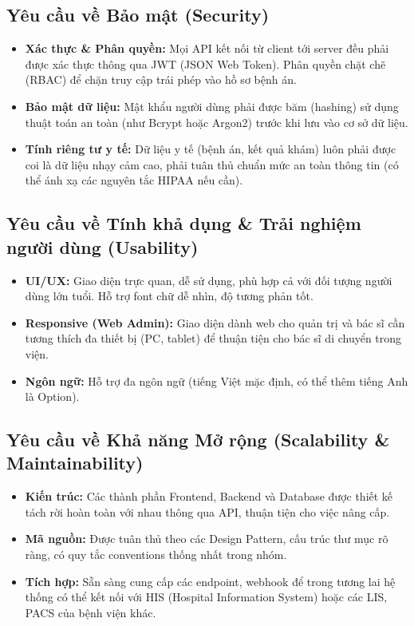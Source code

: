 \documentclass[12pt,a4paper]{article}
\begin{document}
\subsection{Yêu cầu về Bảo mật (Security)}
\begin{itemize}
    \item \textbf{Xác thực \& Phân quyền:} Mọi API kết nối từ client tới server đều phải được xác thực thông qua JWT (JSON Web Token). Phân quyền chặt chẽ (RBAC) để chặn truy cập trái phép vào hồ sơ bệnh án.
    \item \textbf{Bảo mật dữ liệu:} Mật khẩu người dùng phải được băm (hashing) sử dụng thuật toán an toàn (như Bcrypt hoặc Argon2) trước khi lưu vào cơ sở dữ liệu.
    \item \textbf{Tính riêng tư y tế:} Dữ liệu y tế (bệnh án, kết quả khám) luôn phải được coi là dữ liệu nhạy cảm cao, phải tuân thủ chuẩn mức an toàn thông tin (có thể ánh xạ các nguyên tắc HIPAA nếu cần).
\end{itemize}

\subsection{Yêu cầu về Tính khả dụng \& Trải nghiệm người dùng (Usability)}
\begin{itemize}
    \item \textbf{UI/UX:} Giao diện trực quan, dễ sử dụng, phù hợp cả với đối tượng người dùng lớn tuổi. Hỗ trợ font chữ dễ nhìn, độ tương phản tốt.
    \item \textbf{Responsive (Web Admin):} Giao diện dành web cho quản trị và bác sĩ cần tương thích đa thiết bị (PC, tablet) để thuận tiện cho bác sĩ di chuyển trong viện.
    \item \textbf{Ngôn ngữ:} Hỗ trợ đa ngôn ngữ (tiếng Việt mặc định, có thể thêm tiếng Anh là Option).
\end{itemize}

\subsection{Yêu cầu về Khả năng Mở rộng (Scalability \& Maintainability)}
\begin{itemize}
    \item \textbf{Kiến trúc:} Các thành phần Frontend, Backend và Database được thiết kế tách rời hoàn toàn với nhau thông qua API, thuận tiện cho việc nâng cấp.
    \item \textbf{Mã nguồn:} Được tuân thủ theo các Design Pattern, cấu trúc thư mục rõ ràng, có quy tắc conventions thống nhất trong nhóm.
    \item \textbf{Tích hợp:} Sẵn sàng cung cấp các endpoint, webhook để trong tương lai hệ thống có thể kết nối với HIS (Hospital Information System) hoặc các LIS, PACS của bệnh viện khác.
\end{itemize}
\end{document}
